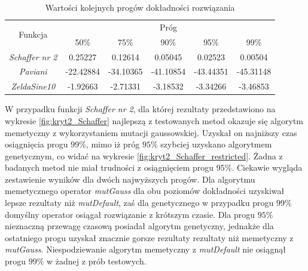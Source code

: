 \begin{table}[ht]
\caption{Wartości kolejnych progów dokładności rozwiązania}
\label{table:kryt2_wartosci_progow}
\begin{center}
\begin{tabular}{|c|c|c|c|c|c|}
	\hline
	\multirow{2}{*}{Funkcja}& \multicolumn{5}{c|}{Próg} \\
	\cline{2-6}
	{} & 50\% & 75\% & 90\% & 95\% & 99\% \\
	\hline
	\emph{Schaffer nr 2} & 0.25227 & 0.12614 & 0.05045 & 0.02523 & 0.00504\\
	\emph{Paviani} & -22.42884 & -34.10365 & -41.10854 & -43.44351 & -45.31148\\
	\emph{ZeldaSine10} & -1.92663 & -2.71331 & -3.18532 & -3.34266 & -3.46853\\
	\hline
	\end{tabular}
\end{center}
\end{table}

\par
W przypadku funkcji \emph{Schaffer nr 2}, dla której rezultaty przedstawiono na wykresie \ref{fig:kryt2_Schaffer} najlepszą z testowanych metod okazuje się algorytm memetyczny z wykorzystaniem mutacji gaussowskiej. Uzyskał on najniższy czas osiągnięcia progu $99\%$, mimo iż próg $95\%$ szybciej uzyskano algorytmem genetycznym, co widać na wykresie \ref{fig:kryt2_Schaffer_restricted}. Żadna z badanych metod nie miał trudności z osiągnięciem progu $95\%$. Ciekawie wygląda zestawienie wyników dla dwóch najwyższych progów. Dla algorytmu memetycznego operator \emph{mutGauss} dla obu poziomów dokładności uzyskiwał lepsze rezultaty niż \emph{mutDefault}, zaś dla genetycznego w przypadku progu $99\%$ domyślny operator osiągał rozwiązanie z krótszym czasie. Dla progu $95\%$ nieznaczną przewagę czasową posiadał algorytm genetyczny, jednakże dla ostatniego progu uzyskał znacznie gorsze rezultaty  rezultaty niż memetyczny z \emph{mutGauss}. Niespodziewanie algorytm memetyczny z \emph{mutDefault} nie osiągnął progu $99\%$ w żadnej z prób testowych. 


